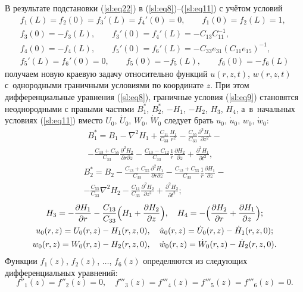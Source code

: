 В результате подстановки (\ref{sl:eq22}) в (\ref{sl:eq8})--(\ref{sl:eq11}) с учётом условий 
\begin{equation}
\label{sl:eq23}
\begin{array}{c}
f_1 (L)=f_2 (0)=f_3 ' (L)=f_4 ' (0)=0, \qquad f_1 (0)=f_2 (L)=1,  \\ 
f_3 (0)=-f_3 (L), \qquad f_3 ' (0)=f_4 ' (L)=-C_{13} C_{11}^{-1}, \\ 
f_4 (0)=-f_4 (L), \qquad f_5 ' (0)=f_6 ' (L)=-C_{33} e_{31} (C_{11} e_{15} )^{-1}, \\
f_5 ' (L)=f_6 ' (0)=0, \qquad  f_5 (0)=-f_5 (L),  \qquad f_6 (0)=-f_6 (L)
\end{array}
\end{equation}
получаем новую краевую задачу относительно функций $u(r, z, t)$, $w(r, z, t)$ с~однородными граничными условиями по  координате $z$. 
При этом дифференциальные уравнения (\ref{sl:eq8}), граничные условия (\ref{sl:eq9}) становятся неоднородными с правыми частями $B_1^*$, $B_2^*$, $-H_1$, $-H_2$, $H_3$, $H_4 $, а~в~начальных условиях (\ref{sl:eq11}) вместо $U_0$, $\dot {U}_0$, $W_0$, $\dot {W}_0 $ следует брать $u_0$, $\dot {u}_0 $, $w_0$, $\dot {w}_0 $:
\begin{multline*}
B_1^*  =B_1 -\nabla ^2H_1 +\frac{C_{11} }{C_{33} }\frac{H_1 }{r^2}-
\frac{C_{55} }{C_{33} }\frac{\partial ^2H_1 }{\partial z^2}- \\-
\frac{C_{13} +C_{55}}{C_{33} }\frac{\partial ^2H_2 }{\partial r\partial z}-
\frac{C_{13} -C_{12}}{C_{33} }\frac{1}{r}\frac{\partial H_2 }{\partial z}+
\frac{\partial ^2H_1 }{\partial t^2}, 
\end{multline*}
\begin{multline*}
B_2^*  =B_2 -\frac{C_{13} +C_{55}}{C_{33} }\frac{\partial ^2H_1 }{\partial r\partial z}-
\frac{C_{12} +C_{55} }{C_{33} }\frac{1}{r}\frac{\partial H_1 }{\partial z}- \\-
\frac{C_{55} }{C_{33} }\nabla ^2H_2 -\frac{C_{11} }{C_{33} }\frac{\partial ^2H_2 }{\partial z^2}+\frac{\partial ^2H_2 }{\partial t^2};
\end{multline*}
\begin{gather*}
H_3 =-\frac{\partial H_1 }{\partial r}-\frac{C_{13} }{C_{33} }\Bigl(H_1 +\frac{\partial H_2 }{\partial z} \Bigr) , 
\quad
H_4 =-\Bigl( \frac{\partial H_2 }{\partial r}+\frac{\partial H_1 }{\partial z} \Bigr); 
\\
u_0 (r, z)=U_0 (r, z)-H_1 (r, z, 0), \quad \dot {u}_0 (r, z)=\dot {U}_0 (r, z)-\dot {H}_1  (r, z, 0);
\\
w_0 (r, z)=W_0 (r, z)-H_2 (r, z, 0), \quad \dot {w}_0 (r, z)=\dot {W}_0 (r, z)-\dot {H}_2  (r, z, 0).
\end{gather*}
Функции $f_1 (z)$, $f_2(z)$, $\ldots$, $f_6 (z)$ определяются из следующих дифференциальных уравнений:
\begin{equation}
\label{sl:eq24}
f''_1 (z)=f''_2 (z)=0, \quad f'''_3 (z)=f'''_4(z)=f'''_5(z)=f'''_6(z)=0.
\end{equation}

